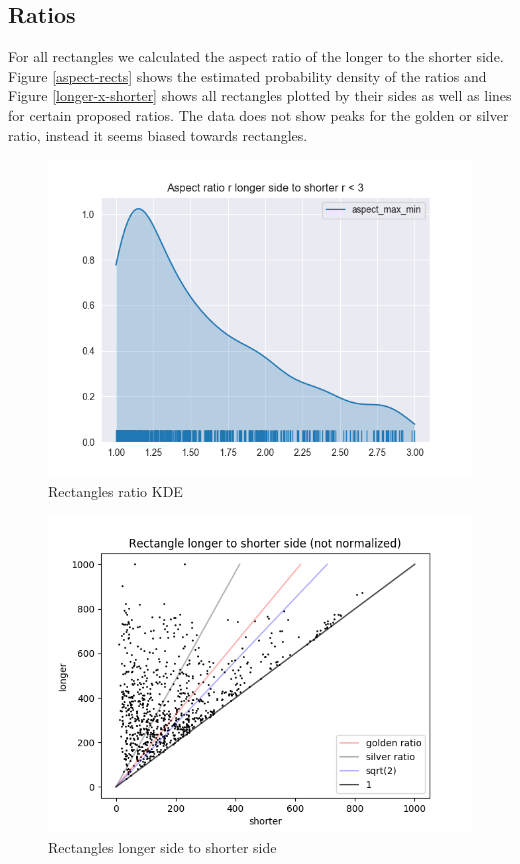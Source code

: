 \subsection{Ratios}

For all rectangles we calculated the aspect ratio of the longer to the shorter
side. Figure \ref{aspect-rects} shows the estimated probability density of the
ratios and Figure \ref{longer-x-shorter} shows all rectangles plotted by their
sides as well as lines for certain proposed ratios. The data does not show peaks
for the golden or silver ratio, instead it seems biased towards rectangles.

\begin{figure}
  \includegraphics[width=\linewidth]{images/aspect-max-min-rects.png}
  \caption{Rectangles ratio KDE}
  \label{fig:aspect-rects}
\end{figure}

\begin{figure}
  \includegraphics[width=\linewidth]{images/longer-x-shorter.png}
  \caption{Rectangles longer side to shorter side}
  \label{fig:longer-x-shorter}
\end{figure}




